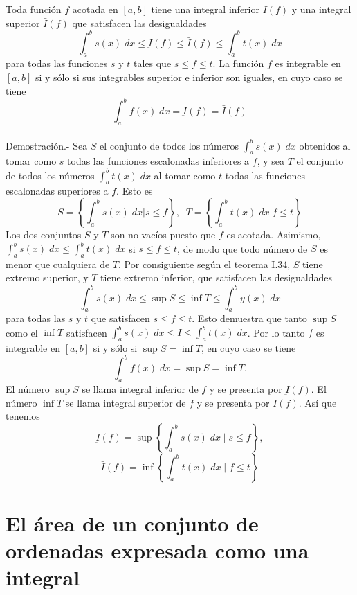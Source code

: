\begin{multicols}{2}
\begin{teo}
    Toda función $f$ acotada en $[a,b]$ tiene una integral inferior $\underbar{I}(f)$ y una integral superior $\bar{I}(f)$ que satisfacen las desigualdades $$\int_a^b s(x) \; dx \leq \underbar{I}(f) \leq \bar{I}(f) \leq \int_a^b t(x) \; dx$$ 
    para todas las funciones $s$ y $t$ tales que $s\leq f\leq t$. La función $f$ es integrable en $[a,b]$ si y sólo si sus integrables superior e inferior son iguales, en cuyo caso se tiene $$\int_a^b f(x) \; dx = \underbar{I}(f)=\bar{I}(f)$$\\
    Demostración.-\; Sea $S$ el conjunto de todos los números $\int_a^b s(x)\; dx$ obtenidos al tomar como $s$ todas las funciones escalonadas inferiores a $f$, y sea $T$ el conjunto de todos los números $\int_a^b t(x)\; dx$ al tomar como $t$ todas las funciones escalonadas superiores a $f$. Esto es 
    $$ S=\left\{ \int_a^b s(x)\; dx | s\leq f\right\}, \;\; T=\left\{ \int_a^b t(x)\; dx | f\leq t\right\}$$ 
    Los dos conjuntos $S$ y $T$ son no vacíos puesto que $f$ es acotada. Asimismo, $\int_a^b s(x)\; dx \leq \int_a^b t(x)\; dx$ si $s\leq f \leq t$, de modo que todo número de $S$ es menor que cualquiera de $T$. Por consiguiente según el teorema I.34, $S$ tiene extremo superior, y $T$ tiene extremo inferior, que satisfacen las desigualdades $$\int_a^b s(x)\; dx \leq \sup S \leq \inf T \leq \int_a^b y(x)\; dx$$
    para todas las $s$ y $t$ que satisfacen $s\leq f\leq t$. Esto demuestra que tanto $\sup S$ como el $\inf T$ satisfacen $\int_a^b s(x)\; dx \leq I\leq \int_a^b t(x)\; dx$. Por lo tanto $f$ es integrable en $[a,b]$ si y sólo si $\sup S = \inf T$, en cuyo caso se tiene $$\int_a^b f(x)\; dx = \sup S = \inf T.$$
    El número $\sup S$ se llama integral inferior de $f$ y se presenta por $\underbar{I}(f)$. El número $\inf T$ se llama integral superior de $f$ y se presenta por $\bar{I}(f)$. Así que tenemos 
    $$\underbar{I}(f)=\sup \left\{\int_a^b s(x) \; dx \; | \; s\leq f\right\},$$ $$ \bar{I}(f)=\inf \left\{\int_a^b t(x) \; dx \; | \; f\leq t\right\}$$
\end{teo}

\section*{El área de un conjunto de ordenadas expresada como una integral}


\end{multicols}
